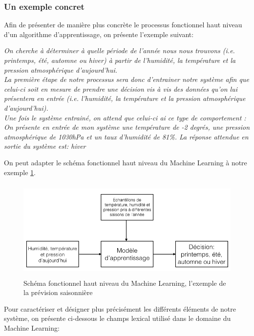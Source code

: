 \subsubsection{Un exemple concret}
\label{Le Machine Learning: Généralités sur le Machine Learning: Définition et principe général:un exemple concret}
Afin de présenter de manière plus concrète le processus fonctionnel haut niveau d'un algorithme d'apprentissage, on présente l'exemple suivant:

\textit{On cherche à déterminer à quelle période de l'année nous nous trouvons (i.e. printemps, été, automne ou hiver) à partir de l'humidité, la température et la pression atmosphérique d'aujourd'hui. \\
	La première étape de notre processus sera donc d'entrainer notre système afin que celui-ci soit en mesure de prendre une décision vis à vis des données qu'on lui présentera en entrée (i.e. l'humidité, la température et la pression atmosphérique d'aujourd'hui). \\
	Une fois le système entrainé, on attend que celui-ci ai ce type de comportement : \\
	On présente en entrée de mon système une température de -2 degrés, une pression atmosphérique de 1030hPa et un taux d'humidité de 81\%. La réponse attendue en sortie du système est: hiver}

On peut adapter le schéma fonctionnel haut niveau du Machine Learning à notre exemple \ref{fig:Schéma fonctionnel haut niveau du Machine Learning, l'exemple prévision saisonnière}. 

\begin{figure}[h]
	\centering\includegraphics[height=5cm]{images/ML_high_level_expl.jpeg}
	\caption{Schéma fonctionnel haut niveau du Machine Learning, l'exemple de la prévision saisonnière}
	\label{fig:Schéma fonctionnel haut niveau du Machine Learning, l'exemple prévision saisonnière}
\end{figure}

Pour caractériser et  désigner plus précisément les différents éléments de notre système, on présente ci-dessous le champs lexical utilisé dans le domaine du Machine Learning:


